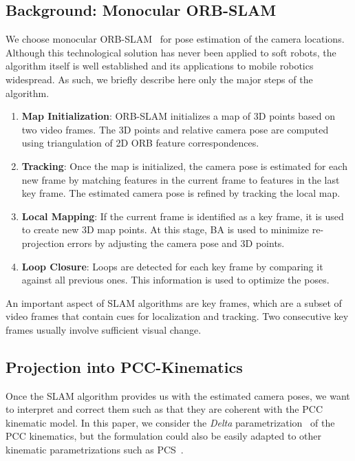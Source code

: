 \subsection{Background: Monocular ORB-SLAM}
We choose monocular ORB-SLAM~\cite{mur2017orb} for pose estimation of the camera locations. Although this technological solution has never been applied to soft robots, the algorithm itself is well established and its applications to mobile robotics widespread. As such, we  briefly describe here only the major steps of the algorithm.%
 \begin{enumerate}
     \item \textbf{Map Initialization}: ORB-SLAM initializes a map of 3D points based on two video frames. The 3D points and relative camera pose are computed using triangulation of 2D ORB feature correspondences.
     \item \textbf{Tracking}: Once the map is initialized, the camera pose is estimated for each new frame by matching features in the current frame to features in the last key frame. The estimated camera pose is refined by tracking the local map.
     \item \textbf{Local Mapping}: If the current frame is identified as a key frame, it is used to create new 3D map points. At this stage, \gls{BA} is used to minimize re-projection errors by adjusting the camera pose and 3D points.
     \item \textbf{Loop Closure}: Loops are detected for each key frame by comparing it against all previous ones. %
     This information is used to optimize the poses.
 \end{enumerate}
An important aspect of \gls{SLAM} algorithms are key frames, which are a subset of video frames that contain cues for localization and tracking. Two consecutive key frames usually involve sufficient visual change. %

\subsection{Projection into PCC-Kinematics}
Once the \gls{SLAM} algorithm provides us with the estimated camera poses, we want to interpret and correct them such as that they are coherent with the \gls{PCC} kinematic model.
%
In this paper, we consider the \emph{Delta} parametrization~\cite{della2020improved} of the \gls{PCC} kinematics, but the formulation could also be easily adapted to other kinematic parametrizations such as \gls{PCS}~\cite{renda2018discrete}.

